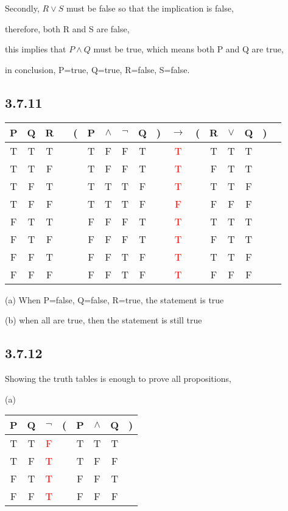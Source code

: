 \documentclass{article}
\begin{document}
Secondly, $R\lor S$ must be false so that the implication is false,

therefore, both R and S are false,

this implies that $P\land Q$ must be true, which means both P and Q are true,

in conclusion, P=true, Q=true, R=false, S=false.

\subsection*{3.7.11}

\begin{tabular}{@{ }c@{ }@{ }c@{ }@{ }c | c@{ }@{}c@{}@{ }c@{ }@{ }c@{ }@{ }c@{ }@{ }c@{ }@{}c@{}@{ }c@{ }@{}c@{}@{ }c@{ }@{ }c@{ }@{ }c@{ }@{}c@{}@{ }c}
P & Q & R &  & ( & P & $\land$ & $\lnot$ & Q & ) & $\rightarrow$ & ( & R & $\lor$ & Q & ) & \\
\hline 
T & T & T &  &  & T & F & F & T &  & \textcolor{red}{T} &  & T & T & T &  & \\
T & T & F &  &  & T & F & F & T &  & \textcolor{red}{T} &  & F & T & T &  & \\
T & F & T &  &  & T & T & T & F &  & \textcolor{red}{T} &  & T & T & F &  & \\
T & F & F &  &  & T & T & T & F &  & \textcolor{red}{F} &  & F & F & F &  & \\
F & T & T &  &  & F & F & F & T &  & \textcolor{red}{T} &  & T & T & T &  & \\
F & T & F &  &  & F & F & F & T &  & \textcolor{red}{T} &  & F & T & T &  & \\
F & F & T &  &  & F & F & T & F &  & \textcolor{red}{T} &  & T & T & F &  & \\
F & F & F &  &  & F & F & T & F &  & \textcolor{red}{T} &  & F & F & F &  & \\
\end{tabular}

(a) When P=false, Q=false, R=true, the statement is true

(b) when all are true, then the statement is still true

\subsection*{3.7.12}

Showing the truth tables is enough to prove all propositions,

(a)

\begin{tabular}{@{ }c@{ }@{ }c | c@{ }@{}c@{}@{ }c@{ }@{ }c@{ }@{ }c@{ }@{}c@{ }}
P & Q & $\lnot$ & ( & P & $\land$ & Q & )\\
\hline 
T & T & \textcolor{red}{F} &  & T & T & T & \\
T & F & \textcolor{red}{T} &  & T & F & F & \\
F & T & \textcolor{red}{T} &  & F & F & T & \\
F & F & \textcolor{red}{T} &  & F & F & F & \\
\end{tabular}
\end{document}
